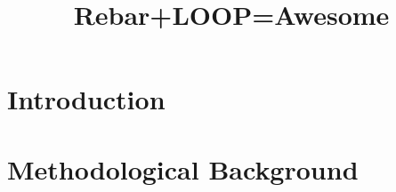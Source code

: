 \documentclass[12pt]{article}
\title{Rebar+LOOP=Awesome}
\begin{document}
\maketitle
\section{Introduction}

\section{Methodological Background}











\end{document}
